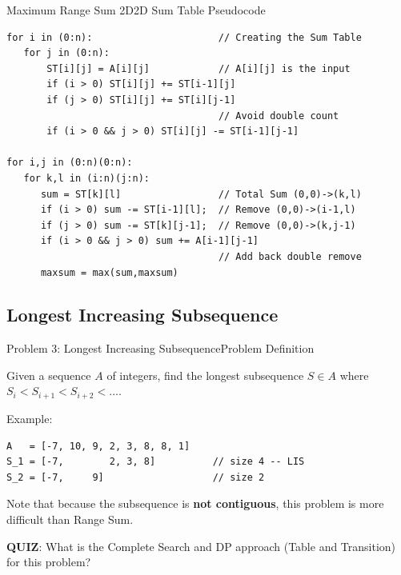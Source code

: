 \begin{frame}[fragile]{Maximum Range Sum 2D}{2D Sum Table Pseudocode}
\begin{block}{}
{\smaller
\begin{verbatim}
for i in (0:n):                      // Creating the Sum Table
   for j in (0:n):
       ST[i][j] = A[i][j]            // A[i][j] is the input
       if (i > 0) ST[i][j] += ST[i-1][j]
       if (j > 0) ST[i][j] += ST[i][j-1]
                                     // Avoid double count
       if (i > 0 && j > 0) ST[i][j] -= ST[i-1][j-1]

for i,j in (0:n)(0:n):
   for k,l in (i:n)(j:n):
      sum = ST[k][l]                 // Total Sum (0,0)->(k,l)
      if (i > 0) sum -= ST[i-1][l];  // Remove (0,0)->(i-1,l)
      if (j > 0) sum -= ST[k][j-1];  // Remove (0,0)->(k,j-1)
      if (i > 0 && j > 0) sum += A[i-1][j-1]
                                     // Add back double remove
      maxsum = max(sum,maxsum)
\end{verbatim}
}
\end{block}

\end{frame}

\subsection{Longest Increasing Subsequence}

\begin{frame}[fragile]{Problem 3: Longest Increasing Subsequence}{Problem Definition}
  \begin{block}{}
    Given a sequence $A$ of integers, find the longest subsequence $S \in A$ where $S_i < S_{i+1} < S_{i+2} < \ldots$.
  \end{block}
  \bigskip

  Example:
\begin{verbatim}
A   = [-7, 10, 9, 2, 3, 8, 8, 1]
S_1 = [-7,        2, 3, 8]          // size 4 -- LIS
S_2 = [-7,     9]                   // size 2
\end{verbatim}
\bigskip

Note that because the subsequence is {\bf not contiguous}, this problem is more difficult than Range Sum.
\bigskip

{\bf QUIZ}: What is the \alert{Complete Search} and \alert{DP approach} (Table and Transition) for this problem?
\end{frame}

